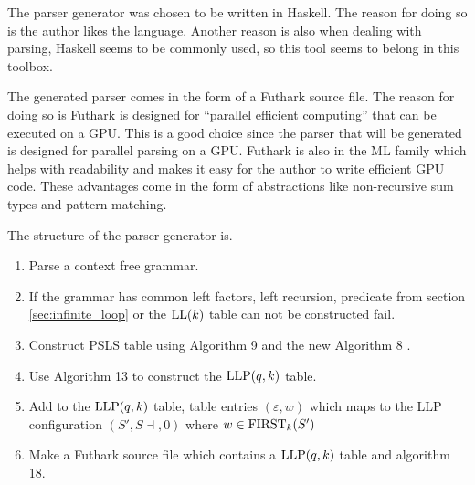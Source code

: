 The parser generator was chosen to be written in Haskell. The reason for doing so is the author likes the language. Another reason is also when dealing with parsing, Haskell seems to be commonly used, so this tool seems to belong in this toolbox.

The generated parser comes in the form of a Futhark source file. The reason for doing so is Futhark is designed for ``parallel efficient computing'' \cite{futhark:homepage} that can be executed on a GPU. This is a good choice since the parser that will be generated is designed for parallel parsing on a GPU. Futhark is also in the ML family which helps with readability and makes it easy for the author to write efficient GPU code. These advantages come in the form of abstractions like non-recursive sum types and pattern matching.

The structure of the parser generator is.
\begin{enumerate}
    \item Parse a context free grammar.
    \item If the grammar has common left factors, left recursion, predicate from section \ref{sec:infinite_loop} or the $\text{LL}(k)$ table can not be constructed fail.
    \item Construct PSLS table using Algorithm 9 and the new Algorithm 8 \cite[13]{Vagner2007}.
    \item Use Algorithm 13 \cite[13]{Vagner2007} to construct the $\text{LLP}(q, k)$ table.
    \item Add to the $\text{LLP}(q, k)$ table, table entries $(\varepsilon, w)$ which maps to the LLP configuration $(S', S \dashv, 0)$ where $w \in \text{FIRST}_k(S')$
    \item Make a Futhark source file which contains a $\text{LLP}(q, k)$ table and algorithm 18.
\end{enumerate}